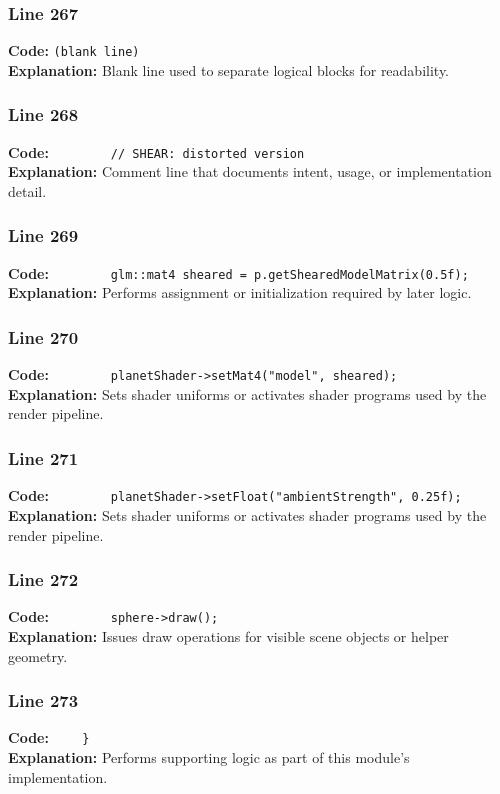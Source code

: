 \documentclass[11pt,a4paper]{article}
\begin{document}
\subsubsection*{Line 267}
\textbf{Code:} \texttt{(blank line)}\\
\textbf{Explanation:} Blank line used to separate logical blocks for readability.

\subsubsection*{Line 268}
\textbf{Code:} \verb|        // SHEAR: distorted version|\\
\textbf{Explanation:} Comment line that documents intent, usage, or implementation detail.

\subsubsection*{Line 269}
\textbf{Code:} \verb|        glm::mat4 sheared = p.getShearedModelMatrix(0.5f);|\\
\textbf{Explanation:} Performs assignment or initialization required by later logic.

\subsubsection*{Line 270}
\textbf{Code:} \verb|        planetShader->setMat4("model", sheared);|\\
\textbf{Explanation:} Sets shader uniforms or activates shader programs used by the render pipeline.

\subsubsection*{Line 271}
\textbf{Code:} \verb|        planetShader->setFloat("ambientStrength", 0.25f);|\\
\textbf{Explanation:} Sets shader uniforms or activates shader programs used by the render pipeline.

\subsubsection*{Line 272}
\textbf{Code:} \verb|        sphere->draw();|\\
\textbf{Explanation:} Issues draw operations for visible scene objects or helper geometry.

\subsubsection*{Line 273}
\textbf{Code:} \verb|    }|\\
\textbf{Explanation:} Performs supporting logic as part of this module's implementation.
\end{document}
